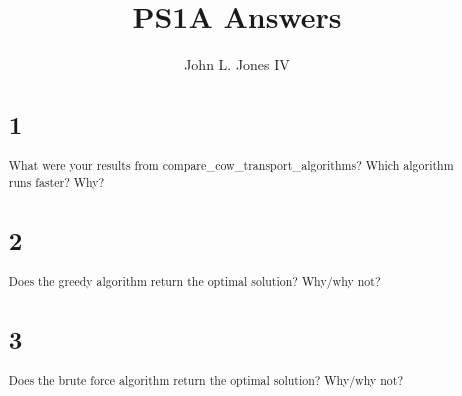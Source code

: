 \documentclass[12pt]{report}
\title{PS1A Answers}
\author{John L. Jones IV}
\begin{document}
\maketitle

\begin{abstract}
\section{1}
What were your results from compare\_cow\_transport\_algorithms? Which algorithm runs faster? Why?

\section{2}
Does the greedy algorithm return the optimal solution? Why/why not?

\section{3}
Does the brute force algorithm return the optimal solution? Why/why not?

\end{abstract}
\end{document}
